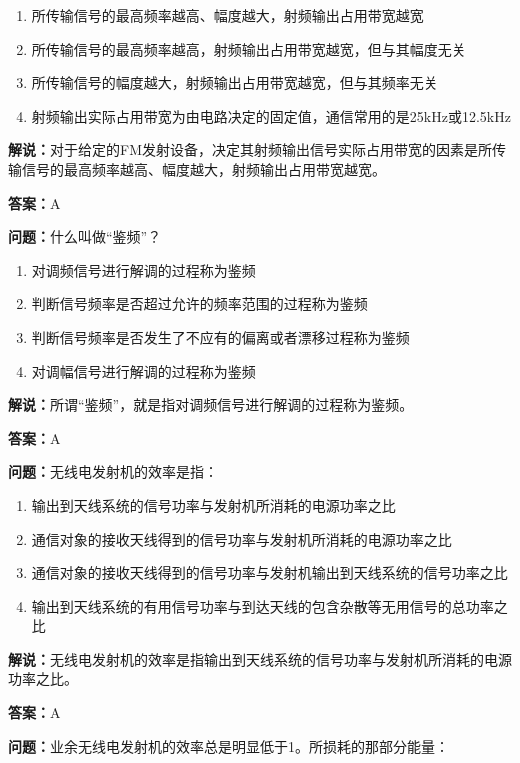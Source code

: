 \begin{enumerate}[label=\Alph*), leftmargin=1cm]
	\item 所传输信号的最高频率越高、幅度越大，射频输出占用带宽越宽
	\item 所传输信号的最高频率越高，射频输出占用带宽越宽，但与其幅度无关
	\item 所传输信号的幅度越大，射频输出占用带宽越宽，但与其频率无关
	\item 射频输出实际占用带宽为由电路决定的固定值，通信常用的是25kHz或12.5kHz
\end{enumerate}

\textbf{解说：}对于给定的FM发射设备，决定其射频输出信号实际占用带宽的因素是所传输信号的最高频率越高、幅度越大，射频输出占用带宽越宽。%

\textbf{答案：}A

\textbf{问题：}什么叫做“鉴频”？

\begin{enumerate}[label=\Alph*), leftmargin=1cm]
	\item 对调频信号进行解调的过程称为鉴频
	\item 判断信号频率是否超过允许的频率范围的过程称为鉴频
	\item 判断信号频率是否发生了不应有的偏离或者漂移过程称为鉴频
	\item 对调幅信号进行解调的过程称为鉴频
\end{enumerate}

\textbf{解说：}所谓“鉴频”，就是指对调频信号进行解调的过程称为鉴频。%

\textbf{答案：}A

\textbf{问题：}无线电发射机的效率是指：

\begin{enumerate}[label=\Alph*), leftmargin=1cm]
	\item 输出到天线系统的信号功率与发射机所消耗的电源功率之比
	\item 通信对象的接收天线得到的信号功率与发射机所消耗的电源功率之比
	\item 通信对象的接收天线得到的信号功率与发射机输出到天线系统的信号功率之比
	\item 输出到天线系统的有用信号功率与到达天线的包含杂散等无用信号的总功率之比
\end{enumerate}

\textbf{解说：}无线电发射机的效率是指输出到天线系统的信号功率与发射机所消耗的电源功率之比。%

\textbf{答案：}A

\textbf{问题：}业余无线电发射机的效率总是明显低于1。所损耗的那部分能量：

